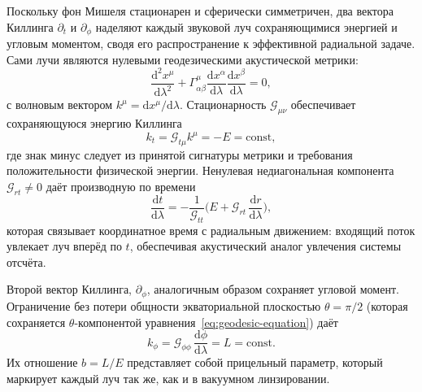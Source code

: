 \documentclass[12pt,a4paper,preprint]{elsarticle}
\begin{document}
            Поскольку фон Мишеля стационарен и сферически симметричен, два вектора Киллинга $\partial_{t}$ и $\partial_{\phi}$ наделяют каждый звуковой луч сохраняющимися энергией и угловым моментом, сводя его распространение к эффективной радиальной задаче. Сами лучи являются нулевыми геодезическими акустической метрики:
            \begin{equation}
                \frac{\mathrm{d}^{2}x^{\mu}}{\mathrm{d}\lambda^{2}} + \Gamma^{\mu}_{\alpha\beta} \frac{\mathrm{d}x^{\alpha}}{\mathrm{d}\lambda} \frac{\mathrm{d}x^{\beta}}{\mathrm{d}\lambda} = 0 ,
                \label{eq:geodesic-equation}
            \end{equation}
            с волновым вектором $k^{\mu}=\mathrm{d}x^{\mu}/\mathrm{d}\lambda$. Стационарность $\mathcal{G}_{\mu\nu}$ обеспечивает сохраняющуюся энергию Киллинга
            \begin{equation}
                k_{t} = \mathcal{G}_{t\mu}k^{\mu} = -E = \mathrm{const} ,
                \label{eq:energy-conservation}
            \end{equation}
            где знак минус следует из принятой сигнатуры метрики и требования положительности физической энергии. Ненулевая недиагональная компонента $\mathcal{G}_{rt}\neq 0$ даёт производную по времени
            \begin{equation}
                \frac{\mathrm{d}t}{\mathrm{d}\lambda} = -\frac{1}{\mathcal{G}_{tt}} \Biggl( E + \mathcal{G}_{rt}\,\frac{\mathrm{d}r}{\mathrm{d}\lambda} \Biggr) ,
                \label{eq:time-coordinate-derivative}
            \end{equation}
            которая связывает координатное время с радиальным движением: входящий поток увлекает луч вперёд по $t$, обеспечивая акустический аналог увлечения системы отсчёта.

            Второй вектор Киллинга, $\partial_{\phi}$, аналогичным образом сохраняет угловой момент. Ограничение без потери общности экваториальной плоскостью $\theta=\pi/2$ (которая сохраняется $\theta$-компонентой уравнения~\eqref{eq:geodesic-equation}) даёт
            \begin{equation}
                k_{\phi} = \mathcal{G}_{\phi\phi}\,\frac{\mathrm{d}\phi}{\mathrm{d}\lambda} = L = \mathrm{const} .
                \label{eq:angular-momentum-conservation}
            \end{equation}
            Их отношение $b=L/E$ представляет собой прицельный параметр, который маркирует каждый луч так же, как и в вакуумном линзировании.
\end{document}
